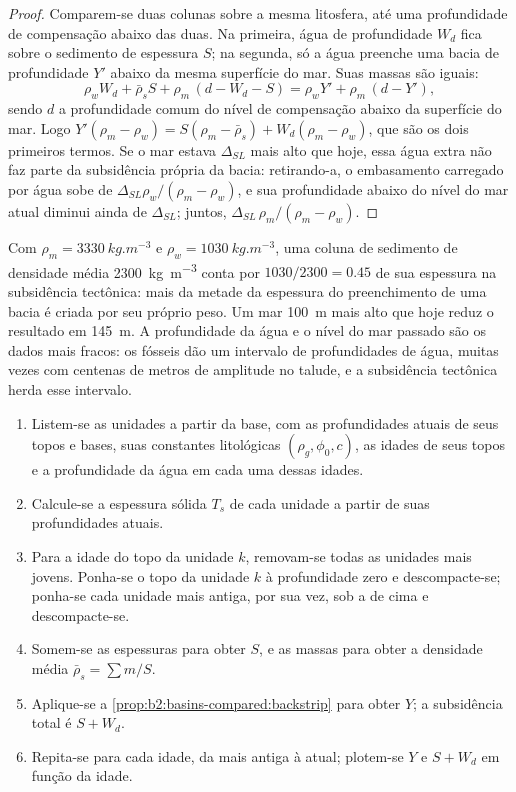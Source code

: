 \begin{proof}
Comparem-se duas colunas sobre a mesma litosfera, até uma profundidade de compensação abaixo das duas. Na
primeira, água de profundidade $W_d$ fica sobre o sedimento de espessura $S$; na segunda, só a água
preenche uma bacia de profundidade $Y'$ abaixo da mesma superfície do mar. Suas massas são iguais:
\[
  \rho_w W_d + \bar\rho_s S + \rho_m\,(d - W_d - S) = \rho_w Y' + \rho_m\,(d - Y'),
\]
sendo $d$ a profundidade comum do nível de compensação abaixo da superfície do mar. Logo
$Y'(\rho_m - \rho_w) = S(\rho_m - \bar\rho_s) + W_d(\rho_m - \rho_w)$, que são os dois primeiros
termos. Se o mar estava $\Delta_{SL}$ mais alto que hoje, essa água extra não faz parte da
subsidência própria da bacia: retirando-a, o embasamento carregado por água sobe de
$\Delta_{SL}\rho_w/(\rho_m - \rho_w)$, e sua profundidade abaixo do nível do mar atual diminui ainda de
$\Delta_{SL}$; juntos, $\Delta_{SL}\,\rho_m/(\rho_m - \rho_w)$.
\end{proof}

Com $\rho_m = \qty{3330}{kg.m^{-3}}$ e $\rho_w = \qty{1030}{kg.m^{-3}}$, uma coluna de sedimento de
densidade média \qty{2300}{kg.m^{-3}} conta por $1030/2300 = 0.45$ de sua espessura na subsidência
tectônica: mais da metade da espessura do preenchimento de uma bacia é criada por seu próprio peso.
Um mar \qty{100}{m} mais alto que hoje reduz o resultado em \qty{145}{m}. A profundidade da água e o
nível do mar passado são os dados mais fracos: os fósseis dão um intervalo de profundidades de água, muitas vezes com centenas de
metros de amplitude no talude, e a subsidência tectônica herda esse intervalo.

\begin{method}\label{met:b2:basins-compared:backstrip}
\begin{enumerate}
  \item Listem-se as unidades a partir da base, com as profundidades atuais de seus topos e bases, suas
        constantes litológicas $(\rho_g, \phi_0, c)$, as idades de seus topos e a profundidade da água em
        cada uma dessas idades.
  \item Calcule-se a espessura sólida $T_s$ de cada unidade a partir de suas profundidades atuais.
  \item Para a idade do topo da unidade $k$, removam-se todas as unidades mais jovens. Ponha-se o topo da unidade
        $k$ à profundidade zero e descompacte-se; ponha-se cada unidade mais antiga, por sua vez, sob a de cima
        e descompacte-se.
  \item Somem-se as espessuras para obter $S$, e as massas para obter a densidade média
        $\bar\rho_s = \sum m / S$.
  \item Aplique-se a \cref{prop:b2:basins-compared:backstrip} para obter $Y$; a subsidência total é
        $S + W_d$.
  \item Repita-se para cada idade, da mais antiga à atual; plotem-se $Y$ e $S + W_d$ em função da idade.
\end{enumerate}
\end{method}


